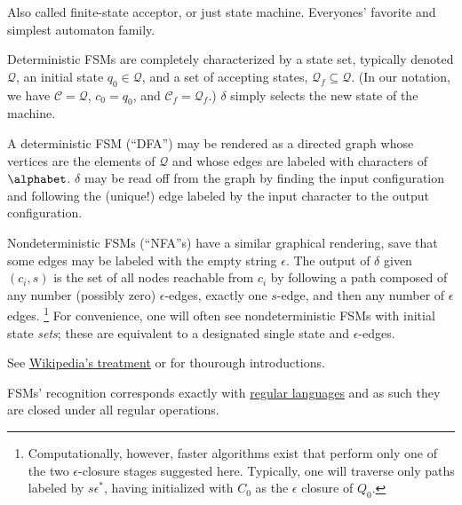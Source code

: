 Also called finite-state acceptor, or just state machine.  Everyones'
favorite and simplest automaton family.

Deterministic FSMs are completely characterized by a state set, typically
denoted $\mathcal{Q}$, an initial state $q_0 \in \mathcal{Q}$, and a set of
accepting states, $\mathcal{Q}_f \subseteq \mathcal{Q}$.  (In our notation,
we have $\mathcal{C} = \mathcal{Q}$, $c_0 = q_0$, and $\mathcal{C}_f =
\mathcal{Q}_f$.)  $\delta$ simply selects the new state of the machine.

A deterministic FSM (``DFA'') may be rendered as a directed graph whose
vertices are the elements of $\mathcal{Q}$ and whose edges are labeled with
characters of $\alphabet$.  $\delta$ may be read off from the graph by finding
the input configuration and following the (unique!) edge labeled by the
input character to the output configuration.

Nondeterministic FSMs (``NFA''s) have a similar graphical rendering, save
that some edges may be labeled with the empty string $\epsilon$.  The output
of $\delta$ given $(c_i, s)$ is the set of all nodes reachable from $c_i$ by
following a path composed of any number (possibly zero) $\epsilon$-edges,
exactly one $s$-edge, and then any number of $\epsilon$ edges.%
%
\footnote{Computationally, however, faster algorithms exist that perform
only one of the two $\epsilon$-closure stages suggested here.  Typically,
one will traverse only paths labeled by $s\epsilon^*$, having initialized
with $C_0$ as the $\epsilon$ closure of $Q_0$.} For convenience, one will
often see nondeterministic FSMs with initial state {\em sets}; these are
equivalent to a designated single state and $\epsilon$-edges.

See \href{http://wikipedia.org/Finite-state\_Machine}{Wikipedia's treatment}
or \cite[Ch. 1]{sipser:theorycomp} for thourough introductions.

FSMs' recognition corresponds exactly with
\href{http://wikipedia.org/Regular\_language}{regular languages} and as such
they are closed under all regular operations.


